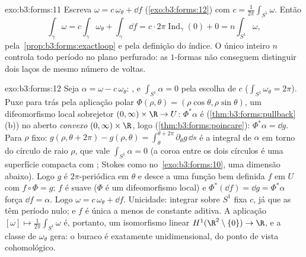 \begin{solution}{exo:b3:forms:11}
Escreva $\omega = c\,\omega_\theta + \dd f$
(\cref{exo:b3:forms:12}) com $c =
\frac1{2\pi}\int_{S^1}\omega$. Então
\[
\int_\gamma\omega = c\int_\gamma\omega_\theta +
\int_\gamma\dd f
= c\cdot2\pi\operatorname{Ind}_\gamma(0) + 0
= n\int_{S^1}\omega,
\]
pela~\cref{prop:b3:forms:exactloop} e pela definição do
índice. O único inteiro $n$ controla todo período no
plano perfurado: as $1$-formas  não conseguem distinguir dois
laços de mesmo número de voltas.
\end{solution}

\begin{solution}{exo:b3:forms:12}
Seja $\alpha = \omega - c\,\omega_\theta$: , e
$\int_{S^1}\alpha = 0$ pela escolha de $c$
($\int_{S^1}\omega_\theta = 2\pi$). Puxe para trás pela aplicação
polar $\Phi(\rho, \theta) = (\rho\cos\theta, \rho\sin\theta)$,
um difeomorfismo local sobrejetor $(0, \infty)\times\R \to
U$: $\Phi^*\alpha$ é 
(\cref{thm:b3:forms:pullback}(b)) no aberto \emph{convexo}
$(0,\infty)\times\R$, logo 
(\cref{thm:b3:forms:poincare}): $\Phi^*\alpha = \dd g$.
Para $\rho$ fixo: $g(\rho, \theta + 2\pi) - g(\rho, \theta)
= \int_\theta^{\theta + 2\pi}\partial_\theta g\,\dd s$ é
a integral de $\alpha$ em torno do círculo de raio
$\rho$, que vale $\int_{S^1}\alpha = 0$ (a coroa
entre os dois círculos é uma superfície compacta com ;
Stokes como no~\cref{exo:b3:forms:10}, uma dimensão abaixo).
Logo $g$ é $2\pi$-periódica em $\theta$ e desce a uma
função bem definida $f$ em $U$ com $f\circ\Phi = g$;
$f$ é suave ($\Phi$ é um difeomorfismo local) e
$\Phi^*(\dd f) = \dd g = \Phi^*\alpha$ força $\dd f =
\alpha$. Logo $\omega = c\,\omega_\theta + \dd f$.
Unicidade: integrar sobre $S^1$ fixa $c$, já que as  têm período nulo; e $f$ é única a menos de constante
aditiva. A aplicação $[\omega] \mapsto
\frac1{2\pi}\int_{S^1}\omega$ é, portanto, um isomorfismo
linear $H^1(\R^2\setminus\{0\}) \to \R$, e a classe
de $\omega_\theta$ gera: o buraco é exatamente
unidimensional, do ponto de vista cohomológico.
\end{solution}

